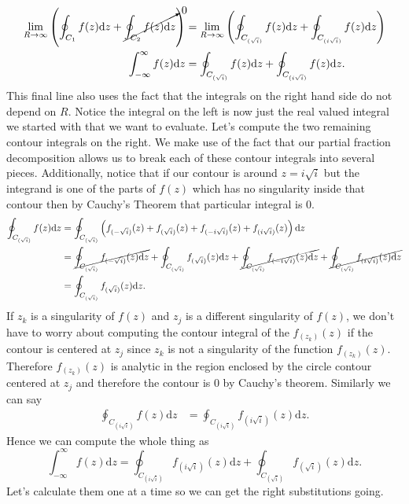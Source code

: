 \documentclass[10pt]{amsart}
\newcommand{\D}{\mathrm{d}}
\theoremstyle{nonumberplain}
\begin{document}
\begin{enumerate}[label={\bf {\arabic*}:}]
\begin{align*}
\lim_{R\rightarrow\infty} \left( \oint_{C_1} f(z) \D z + \cancelto{0}{\oint_{C_2} f(z) \D z} \right)
	&= \lim_{R\rightarrow\infty} \left( \oint_{C_{(\sqrt{i})}} f(z) \D z + \oint_{C_{(i\sqrt{i})}} f(z) \D z \right) \\
\int_{-\infty}^{\infty} f(z) \D z
	&= \oint_{C_{(\sqrt{i})}} f(z) \D z + \oint_{C_{(i\sqrt{i})}} f(z) \D z. \\
\end{align*}
This final line also uses the fact that the integrals on the right hand side do not depend on $R$.
Notice the integral on the left is now just the real valued integral we started with that we want to evaluate.
Let's compute the two remaining contour integrals on the right.
We make use of the fact that our partial fraction decomposition allows us to break each of these contour integrals into several pieces. Additionally, notice that if our contour is around $z=i\sqrt{i}$ but the integrand is one of the parts of $f(z)$ which has no singularity inside that contour then by Cauchy's Theorem that particular integral is 0.
\begin{align*}
\oint_{C_{(\sqrt{i})}} f(z) \D z &= \oint_{C_{(\sqrt{i})}} \left(
	f_{(-\sqrt{i})}(z) + f_{(\sqrt{i})}(z) + f_{(-i\sqrt{i})}(z) + f_{(i\sqrt{i})}(z)
	\right) \D z \\
	&= \cancel{\oint_{C_{(\sqrt{i})}} f_{(-\sqrt{i})}(z) \D z}
	+ \oint_{C_{(\sqrt{i})}} f_{(\sqrt{i})}(z) \D z
	+ \cancel{\oint_{C_{(\sqrt{i})}} f_{(-i\sqrt{i})}(z) \D z}
	+ \cancel{\oint_{C_{(\sqrt{i})}} f_{(i\sqrt{i})}(z) \D z} \\
	&= \oint_{C_{(\sqrt{i})}} f_{(\sqrt{i})}(z) \D z.
\end{align*}
If $z_k$ is a singularity of $f(z)$ and $z_j$ is a different singularity of $f(z)$, we don't have to worry about computing the contour integral of the $f_{(z_k)}(z)$ if the contour is centered at $z_j$ since $z_k$ is not a singularity of the function $f_{(z_k)}(z)$.
Therefore $f_{(z_k)}(z)$ is analytic in the region enclosed by the circle contour centered at $z_j$ and therefore the contour is 0 by Cauchy's theorem.
Similarly we can say 
\begin{align*}
\oint_{C_{(i\sqrt{i})}} f(z) \D z &= \oint_{C_{(i\sqrt{i})}} f_{(i\sqrt{i})}(z) \D z.
\end{align*}
Hence we can compute the whole thing as
$$
\int_{-\infty}^{\infty} f(z) \D z = \oint_{C_{(i\sqrt{i})}} f_{(i\sqrt{i})}(z) \D z + \oint_{C_{(\sqrt{i})}} f_{(\sqrt{i})}(z) \D z.
$$
Let's calculate them one at a time so we can get the right substitutions going.

\end{enumerate}
\end{document}
